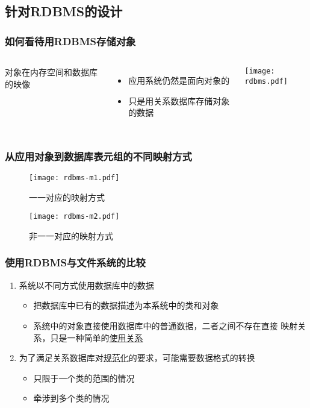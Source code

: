 \documentclass[compress]{beamer}
\begin{document}
\subsection[RDBMS]{针对RDBMS的设计}

\begin{frame}
  \frametitle{如何看待用RDBMS存储对象}
  \begin{columns}[t]
    \column{0.6\hsize}

  对象在内存空间和数据库的映像
  \begin{itemize}
    \item 应用系统仍然是面向对象的
    \item 只是用关系数据库存储对象的数据
  \end{itemize}

    \column{0.4\hsize}

  \centering\texttt{[image: rdbms.pdf]}
\end{columns}
\end{frame}

\begin{frame}
  \frametitle{从应用对象到数据库表元组的不同映射方式}

   {

  \centering\begin{figure}
    \texttt{[image: rdbms-m1.pdf]}

    一一对应的映射方式
  \end{figure}
  }

   {
    \centering\begin{figure}
    \texttt{[image: rdbms-m2.pdf]}

    非一一对应的映射方式
  \end{figure}
  }
\end{frame}

\begin{frame}
  \frametitle{使用RDBMS与文件系统的比较}

  \begin{enumerate}
    \item 系统以不同方式使用数据库中的数据
      \begin{itemize}
        \item 把数据库中已有的数据描述为本系统中的类和对象
        \item 系统中的对象直接使用数据库中的普通数据，二者之间不存在直接
          映射关系，只是一种简单的\uline{使用关系}
      \end{itemize}
    \item 为了满足关系数据库对\uline{规范化}的要求，可能需要数据格式的转换
      \begin{itemize}
        \item 只限于一个类的范围的情况
        \item 牵涉到多个类的情况
      \end{itemize}
  \end{enumerate}
\end{frame}
\end{document}
